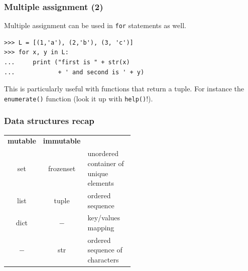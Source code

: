 \documentclass[english,serif,mathserif,xcolor=pdftex,dvipsnames,table]{beamer}
\begin{document}
\begin{frame}[fragile]
\frametitle{Multiple assignment (2)}
Multiple assignment can be used in \texttt{for} statements as well.
\begin{lstlisting}
>>> L = [(1,'a'), (2,'b'), (3, 'c')]
>>> for x, y in L:
...     print ("first is " + str(x)
...            + ' and second is ' + y)
\end{lstlisting}

  \+
  This is particularly useful with functions that return a tuple.
  For instance the \texttt{enumerate()} function (look it up with
  \texttt{help()}!).
\end{frame}



\begin{frame}
  \frametitle{Data structures recap}
  \begin{center}
    \begin{tabular}{>{\ttfamily}c|>{\ttfamily}c|>{\footnotesize}p{0.5\linewidth}}
      \rmfamily \textbf{mutable} & \rmfamily \textbf{immutable} & \\
      set & frozenset & unordered container of
      unique elements\\[1ex]
      list & tuple & ordered sequence\\[1ex]
      dict & $-$ & key/values mapping\\[1ex]
      $-$& str & ordered sequence of characters\\
    \end{tabular}
  \end{center}
\end{frame}





\end{document}
